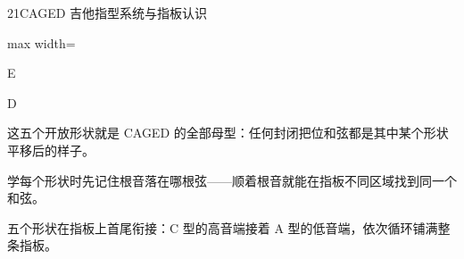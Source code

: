\begin{lessoncard}{21}{CAGED 吉他指型系统与指板认识}
\begin{fignote}
\begin{center}
\begin{adjustbox}{max width=\textwidth}
\begin{chordbox}{E}
\end{chordbox}\hspace{7mm}%
\begin{chordbox}{D}
\end{chordbox}
\end{adjustbox}
\end{center}
\begin{fignotes}
\item 这五个开放形状就是 CAGED 的全部母型：任何封闭把位和弦都是其中某个形状平移后的样子。
\item 学每个形状时先记住根音落在哪根弦——顺着根音就能在指板不同区域找到同一个和弦。
\item 五个形状在指板上首尾衔接：C 型的高音端接着 A 型的低音端，依次循环铺满整条指板。
\end{fignotes}
\end{fignote}
\end{lessoncard}

